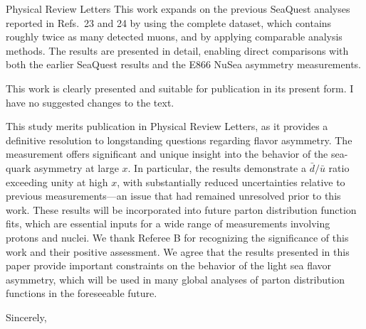 \documentclass[letterpaper,12pt,oneside,final]{letter}
\makeatletter
\renewenvironment*{displayquote}
  {\begingroup\color{blue}\csq@getcargs{\csq@bdquote{}{}}}
  {\csq@edquote\endgroup}
\makeatother
\begin{document}
\begin{letter}{Physical Review Letters}
\begin{displayquote}
		This work expands on the previous SeaQuest analyses reported in Refs.~23 and 24 by using the complete dataset,
		which contains roughly twice as many detected muons, and by applying comparable analysis methods.
		The results are presented in detail, enabling direct comparisons with both the earlier
		SeaQuest results and the E866 NuSea asymmetry measurements.

		This work is clearly presented and suitable for publication in its present form.
		I have no suggested changes to the text.

		This study merits publication in Physical Review Letters,
		as it provides a definitive resolution to longstanding questions regarding flavor asymmetry.
		The measurement offers significant and unique insight into the behavior of the sea-quark asymmetry at large $x$.
		In particular, the results demonstrate a $\bar{d}/\bar{u}$ ratio exceeding unity at high $x$,
		with substantially reduced uncertainties relative to previous measurements—an issue that had remained unresolved prior to this work.
		These results will be incorporated into future parton distribution function fits,
		which are essential inputs for a wide range of measurements involving protons and nuclei.
	\end{displayquote}
	We thank Referee B for recognizing the significance of this work and their positive assessment.
	We agree that the results presented in this paper provide important constraints on the behavior of the light sea flavor asymmetry,
	which will be used in many global analyses of parton distribution functions in the foreseeable future.

	\hrulefill
	\closing{Sincerely,}
\end{letter}
\end{document}
